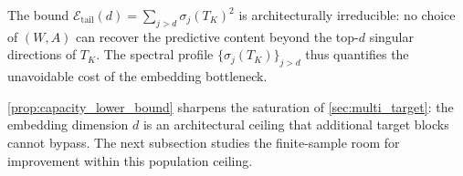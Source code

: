 
\begin{remark}
\label{rem:capacity_interpretation}
The bound $\mathcal{E}_\mathrm{tail}(d) = \sum_{j>d} \sigma_j(T_K)^2$ is
architecturally irreducible: no choice of $(W,A)$ can recover the
predictive content beyond the top-$d$ singular directions of $T_K$. The
spectral profile $\{\sigma_j(T_K)\}_{j>d}$ thus quantifies the unavoidable cost of the embedding bottleneck.
\end{remark}

\cref{prop:capacity_lower_bound} sharpens the saturation of \cref{sec:multi_target}: the embedding dimension
$d$ is an architectural ceiling that additional target blocks cannot bypass.
The next subsection studies the finite-sample room for improvement within this population ceiling.


